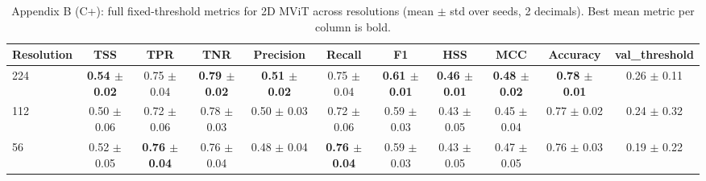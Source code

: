 \begin{table}[p]
\centering
\scriptsize
\setlength{\tabcolsep}{3.5pt}
\caption{Appendix B (C+): full fixed-threshold metrics for 2D MViT across resolutions (mean $\pm$ std over seeds, 2 decimals). Best mean metric per column is bold.}
\label{tab:appB_full_cplus}
\begin{tabular}{lcccccccccc}
\toprule
Resolution & TSS & TPR & TNR & Precision & Recall & F1 & HSS & MCC & Accuracy & val\_threshold \\
\midrule
224 & \textbf{0.54 $\pm$ 0.02} & 0.75 $\pm$ 0.04 & \textbf{0.79 $\pm$ 0.02} & \textbf{0.51 $\pm$ 0.02} & 0.75 $\pm$ 0.04 & \textbf{0.61 $\pm$ 0.01} & \textbf{0.46 $\pm$ 0.01} & \textbf{0.48 $\pm$ 0.02} & \textbf{0.78 $\pm$ 0.01} & 0.26 $\pm$ 0.11 \\
112 & 0.50 $\pm$ 0.06 & 0.72 $\pm$ 0.06 & 0.78 $\pm$ 0.03 & 0.50 $\pm$ 0.03 & 0.72 $\pm$ 0.06 & 0.59 $\pm$ 0.03 & 0.43 $\pm$ 0.05 & 0.45 $\pm$ 0.04 & 0.77 $\pm$ 0.02 & 0.24 $\pm$ 0.32 \\
56 & 0.52 $\pm$ 0.05 & \textbf{0.76 $\pm$ 0.04} & 0.76 $\pm$ 0.04 & 0.48 $\pm$ 0.04 & \textbf{0.76 $\pm$ 0.04} & 0.59 $\pm$ 0.03 & 0.43 $\pm$ 0.05 & 0.47 $\pm$ 0.05 & 0.76 $\pm$ 0.03 & 0.19 $\pm$ 0.22 \\
\bottomrule
\end{tabular}
\end{table}
